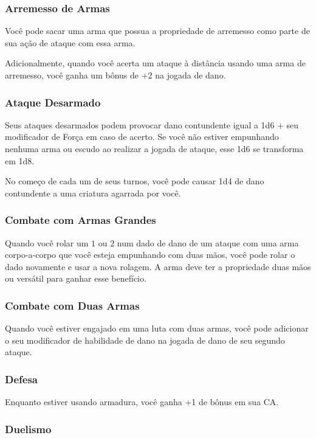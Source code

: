 \begin{multicols}{2}
\subsubsection{Arremesso de Armas}%

Você pode sacar uma arma que possua a propriedade de arremesso como parte de sua
ação de ataque com essa arma.

Adicionalmente, quando você acerta um ataque à distância usando uma arma de
arremesso, você ganha um bônus de +2 na jogada de dano.

\subsubsection{Ataque Desarmado}%

Seus ataques desarmados podem provocar dano contundente igual a 1d6 + seu
modificador de Força em caso de acerto. Se você não estiver empunhando nenhuma
arma ou escudo ao realizar a jogada de ataque, esse 1d6 se transforma em 1d8.

No começo de cada um de seus turnos, você pode causar 1d4 de dano contundente a
uma criatura agarrada por você.

\subsubsection{Combate com Armas Grandes}%

Quando você rolar um $1$ ou $2$ num dado de dano de um ataque com uma arma
corpo-a-corpo que você esteja empunhando com duas mãos, você pode rolar o dado
novamente e usar a nova rolagem. A arma deve ter a propriedade duas mãos ou
versátil para ganhar esse benefício.

\subsubsection{Combate com Duas Armas}%

Quando você estiver engajado em uma luta com duas armas, você pode adicionar o
seu modificador de habilidade de dano na jogada de dano de seu segundo ataque.

\subsubsection{Defesa}%

Enquanto estiver usando armadura, você ganha +1 de bônus em sua CA.

\subsubsection{Duelismo}%


\end{multicols}
